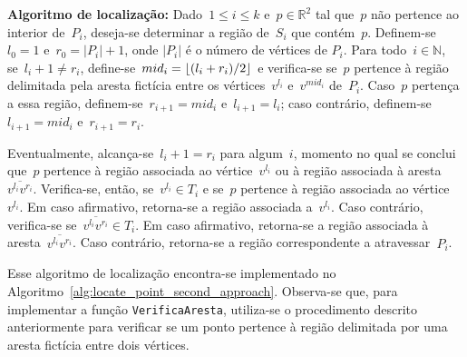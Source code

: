 \documentclass[11pt]{article}
\newcommand{\algref}[1]{\ref{#1}}
\newenvironment{blockQuote}[1][lightgray]{\begin{mdframed}[
	leftline=true,
	topline=false,
	bottomline=false,
	rightline=false,
	linecolor=gray,
	linewidth=2pt,
	backgroundcolor=#1,
	skipabove=\baselineskip,
	skipbelow=\baselineskip,
	innerleftmargin=10pt,
	innerrightmargin=10pt,
	innertopmargin=5pt,
	innerbottommargin=5pt]
}
{\end{mdframed}}
\DeclarePairedDelimiter{\floor}{\lfloor}{\rfloor}
\begin{document}
\begin{blockQuote}

	\textbf{Algoritmo de localização:} Dado~\(1 \le i \le k\) e~\(p \in \mathbb{R}^2\) tal que~\(p\) não pertence ao interior de~\(P_i\), deseja-se determinar a região de~\(S_i\) que contém~\(p\). 
	Definem-se~\(l_0 = 1\) e~\(r_0 = |P_i| + 1\), onde \(|P_i|\) é o número de vértices de \(P_i\). Para todo~\(i \in \mathbb{N}\), se~\(l_i + 1 \ne r_i\), define-se~\(mid_i = \floor{(l_i + r_i) / 2}\) e verifica-se se~\(p\) pertence à região delimitada pela aresta fictícia entre os vértices~\(v^{l_i}\) e~\(v^{mid_i}\) de~\(P_i\). Caso~\(p\) pertença a essa região, definem-se~\(r_{i + 1} = mid_i\) e~\(l_{i + 1} = l_i\); caso contrário, definem-se~\(l_{i + 1} = mid_i\) e~\(r_{i + 1} = r_i\). 
	
	Eventualmente, alcança-se~\(l_i + 1 = r_i\) para algum~\(i\), momento no qual se conclui que~\(p\) pertence à região associada ao vértice~\(v^{l_i}\) ou à região associada à aresta~\(\overline{v^{l_i} v^{r_i}}\). Verifica-se, então, se~\(v^{l_i} \in T_i\) e se~\(p\) pertence à região associada ao vértice~\(v^{l_i}\). Em caso afirmativo, retorna-se a região associada a~\(v^{l_i}\). Caso contrário, verifica-se se~\(\overline{v^{l_i} v^{r_i}} \in T_i\). Em caso afirmativo, retorna-se a região associada à aresta~\(\overline{v^{l_i} v^{r_i}}\). Caso contrário, retorna-se a região correspondente a atravessar~\(P_i\).

	Esse algoritmo de localização encontra-se implementado no Algoritmo~\algref{alg:locate_point_second_approach}. Observa-se que, para implementar a função \texttt{VerificaAresta}, utiliza-se o procedimento descrito anteriormente para verificar se um ponto pertence à região delimitada por uma aresta fictícia entre dois vértices.

\end{blockQuote}
\end{document}
